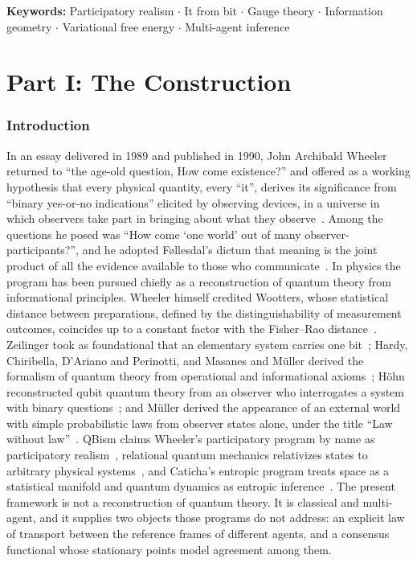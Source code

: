 \documentclass[11pt]{article}
\begin{document}
\noindent\textbf{Keywords:} Participatory realism $\cdot$ It from bit $\cdot$ Gauge theory $\cdot$ Information geometry $\cdot$ Variational free energy $\cdot$ Multi-agent inference

\tableofcontents
\clearpage

\part*{Part I: The Construction}

\section{Introduction}\label{sec:introduction}

In an essay delivered in 1989 and published in 1990, John Archibald Wheeler returned to ``the age-old question, How come existence?'' and offered as a working hypothesis that every physical quantity, every ``it'', derives its significance from ``binary yes-or-no indications'' elicited by observing devices, in a universe in which observers take part in bringing about what they observe~\cite{Wheeler1990, Wheeler1983}. Among the questions he posed was ``How come `one world' out of many observer-participants?'', and he adopted F{\o}llesdal's dictum that meaning is the joint product of all the evidence available to those who communicate~\cite{Wheeler1990}. In physics the program has been pursued chiefly as a reconstruction of quantum theory from informational principles. Wheeler himself credited Wootters, whose statistical distance between preparations, defined by the distinguishability of measurement outcomes, coincides up to a constant factor with the Fisher--Rao distance~\cite{Wootters1981}. Zeilinger took as foundational that an elementary system carries one bit~\cite{Zeilinger1999}; Hardy, Chiribella, D'Ariano and Perinotti, and Masanes and M{\"u}ller derived the formalism of quantum theory from operational and informational axioms~\cite{Hardy2001, ChiribellaDArianoPerinotti2011, MasanesMueller2011}; H{\"o}hn reconstructed qubit quantum theory from an observer who interrogates a system with binary questions~\cite{Hoehn2017}; and M{\"u}ller derived the appearance of an external world with simple probabilistic laws from observer states alone, under the title ``Law without law''~\cite{Mueller2020}. QBism claims Wheeler's participatory program by name as participatory realism~\cite{Fuchs2017}, relational quantum mechanics relativizes states to arbitrary physical systems~\cite{Rovelli1996}, and Caticha's entropic program treats space as a statistical manifold and quantum dynamics as entropic inference~\cite{Caticha2005, Caticha2019spacetime, Caticha2019}. The present framework is not a reconstruction of quantum theory. It is classical and multi-agent, and it supplies two objects those programs do not address: an explicit law of transport between the reference frames of different agents, and a consensus functional whose stationary points model agreement among them.
\end{document}
